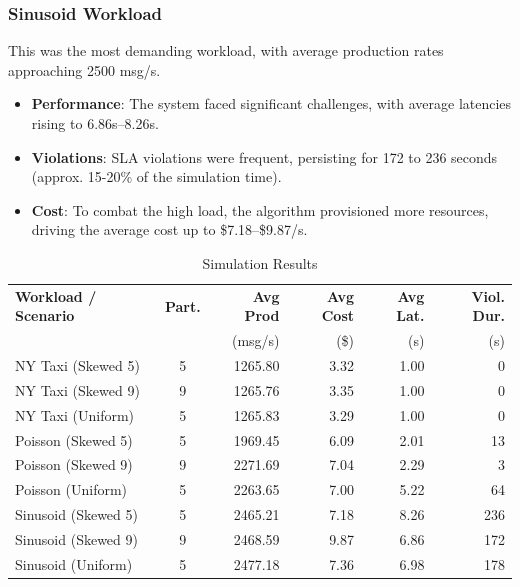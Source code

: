 ﻿\documentclass[conference]{IEEEtran}
\begin{document}
\subsubsection{Sinusoid Workload}
This was the most demanding workload, with average production rates approaching 2500 msg/s.
\begin{itemize}
    \item \textbf{Performance}: The system faced significant challenges, with average latencies rising to 6.86s--8.26s.
    \item \textbf{Violations}: SLA violations were frequent, persisting for 172 to 236 seconds (approx. 15-20\% of the simulation time).
    \item \textbf{Cost}: To combat the high load, the algorithm provisioned more resources, driving the average cost up to \$7.18--\$9.87/s.
\end{itemize}

\begin{table}[h]
\centering
\small 
\setlength{\tabcolsep}{0.5pt}
\caption{Simulation Results}
\label{tab:simulation_results}
\begin{tabular}{lcrrrr}
\toprule
\textbf{Workload / Scenario} & \textbf{Part.} & \textbf{Avg Prod} & \textbf{Avg Cost} & \textbf{Avg Lat.} & \textbf{Viol. Dur.} \\
& & (msg/s) & (\$) & (s) & (s) \\
\midrule
NY Taxi (Skewed 5) & 5 & 1265.80 & 3.32 & 1.00 & 0 \\
NY Taxi (Skewed 9) & 9 & 1265.76 & 3.35 & 1.00 & 0 \\
NY Taxi (Uniform)  & 5 & 1265.83 & 3.29 & 1.00 & 0 \\
\midrule
Poisson (Skewed 5) & 5 & 1969.45 & 6.09 & 2.01 & 13 \\
Poisson (Skewed 9) & 9 & 2271.69 & 7.04 & 2.29 & 3 \\
Poisson (Uniform)  & 5 & 2263.65 & 7.00 & 5.22 & 64 \\
\midrule
Sinusoid (Skewed 5) & 5 & 2465.21 & 7.18 & 8.26 & 236 \\
Sinusoid (Skewed 9) & 9 & 2468.59 & 9.87 & 6.86 & 172 \\
Sinusoid (Uniform)  & 5 & 2477.18 & 7.36 & 6.98 & 178 \\
\bottomrule
\end{tabular}
\end{table}
\end{document}
